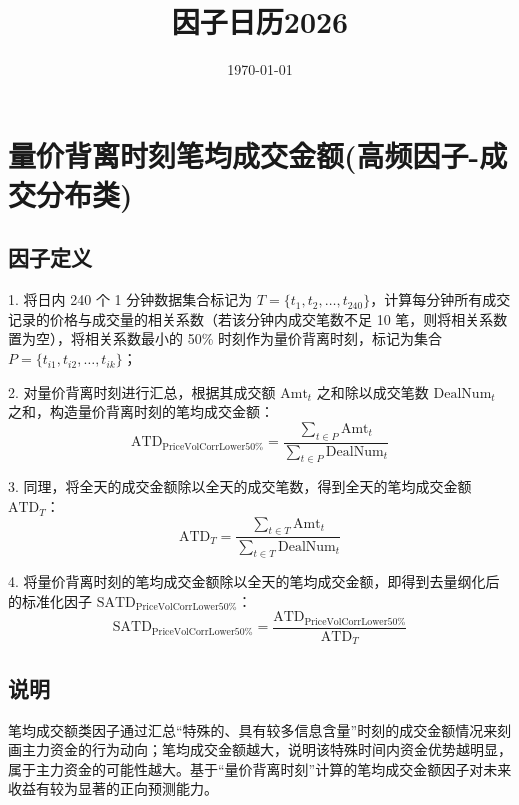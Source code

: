 \documentclass{article}
\title{因子日历2026}
\date{\today}
\begin{document}
\maketitle

\section{量价背离时刻笔均成交金额(高频因子-成交分布类)}

\subsection{因子定义}

1. 将日内 240 个 1 分钟数据集合标记为 \( T = \{t_1, t_2, \dots, t_{240}\} \)，计算每分钟所有成交记录的价格与成交量的相关系数（若该分钟内成交笔数不足 10 笔，则将相关系数置为空），将相关系数最小的 50\% 时刻作为量价背离时刻，标记为集合 \( P = \{t_{i1}, t_{i2}, \dots, t_{ik}\} \)；

2. 对量价背离时刻进行汇总，根据其成交额 \( \mathrm{Amt}_t \) 之和除以成交笔数 \( \mathrm{DealNum}_t \) 之和，构造量价背离时刻的笔均成交金额：
\begin{equation}
    \mathrm{ATD}_{\mathrm{PriceVolCorrLower50\%}} = \frac{\sum_{t \in P} \mathrm{Amt}_t}{\sum_{t \in P} \mathrm{DealNum}_t}
\end{equation}

3. 同理，将全天的成交金额除以全天的成交笔数，得到全天的笔均成交金额 \( \mathrm{ATD}_T \)：
\begin{equation}
    \mathrm{ATD}_T = \frac{\sum_{t \in T} \mathrm{Amt}_t}{\sum_{t \in T} \mathrm{DealNum}_t}
\end{equation}

4. 将量价背离时刻的笔均成交金额除以全天的笔均成交金额，即得到去量纲化后的标准化因子 \( \mathrm{SATD}_{\mathrm{PriceVolCorrLower50\%}} \)：
\begin{equation}
    \mathrm{SATD}_{\mathrm{PriceVolCorrLower50\%}} = \frac{\mathrm{ATD}_{\mathrm{PriceVolCorrLower50\%}}}{\mathrm{ATD}_T}
\end{equation}

\subsection{说明}
笔均成交额类因子通过汇总“特殊的、具有较多信息含量”时刻的成交金额情况来刻画主力资金的行为动向；笔均成交金额越大，说明该特殊时间内资金优势越明显，属于主力资金的可能性越大。基于“量价背离时刻”计算的笔均成交金额因子对未来收益有较为显著的正向预测能力。
\end{document}
